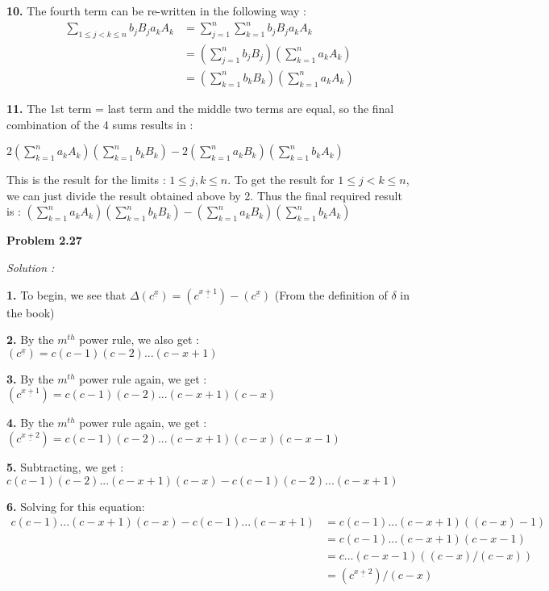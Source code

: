 \documentclass[12pt]{article}
\begin{document}
{\bf 10. }The fourth term can be re-written in the following way :
\begin{equation}\label{eq2}
  \begin{split}
     \sum\limits_{1 \leq j < k \leq n}^{} b_jB_ja_kA_k & = \sum\limits_{j=1}^{n}\sum\limits_{k=1}^{n} {b_jB_ja_kA_k} \\
     & = (\sum\limits_{j=1}^{n}{b_jB_j}) (\sum\limits_{k=1}^{n} {a_kA_k})\\
     & = (\sum\limits_{k=1}^{n}{b_kB_k}) (\sum\limits_{k=1}^{n} {a_kA_k})
  \end{split}
\end{equation}

{\bf 11. } The 1st term = last term and the middle two terms are equal, so the final combination of the 4 sums results in :

$2(\sum\limits_{k=1}^{n}{a_kA_k}) (\sum\limits_{k=1}^{n} {b_kB_k}) - 2(\sum\limits_{k=1}^{n}{a_kB_k}) (\sum\limits_{k=1}^{n} {b_kA_k})$

This is the result for the limits : $1 \leq j , k \leq n$. To get the result for $1 \leq j < k \leq n$, we can just divide the result obtained above by 2. Thus the final required result is : $(\sum\limits_{k=1}^{n}{a_kA_k}) (\sum\limits_{k=1}^{n} {b_kB_k}) - (\sum\limits_{k=1}^{n}{a_kB_k}) (\sum\limits_{k=1}^{n} {b_kA_k})$

\medskip
\medskip

\noindent
{\bf Problem 2.27}

\textit {Solution :}

{\bf 1. } To begin, we see that ${\Delta (c^{\underline{x}})} = {(c^{\underline{x+1}})} - {(c^{\underline{x}})}$  (From the definition of $\delta$ in the book)

{\bf 2. } By the $m^{th}$ power rule, we also get : $ {(c^{\underline{x}})} = c(c-1)(c-2)...(c-x+1) $

{\bf 3. } By the $m^{th}$ power rule again, we get : $ {(c^{\underline{x+1}})} = c(c-1)(c-2)...(c-x+1)(c-x) $

{\bf 4. } By the $m^{th}$ power rule again, we get : $ {(c^{\underline{x+2}})} = c(c-1)(c-2)...(c-x+1)(c-x)(c-x-1) $

{\bf 5. } Subtracting, we get : $ c(c-1)(c-2)...(c-x+1)(c-x) - c(c-1)(c-2)...(c-x+1) $

{\bf 6. } Solving for this equation:
\begin{equation}\label{eq3}
  \begin{split}
     c(c-1)...(c-x+1)(c-x) - c(c-1)...(c-x+1) & = c(c-1)...(c-x+1)((c-x) - 1) \\
     & = c(c-1)...(c-x+1)(c-x-1) \\
     & = c...(c-x-1)((c-x)/(c-x)) \\
     & = {(c^{\underline{x+2}})} / (c-x)
  \end{split}
\end{equation}
\end{document}
